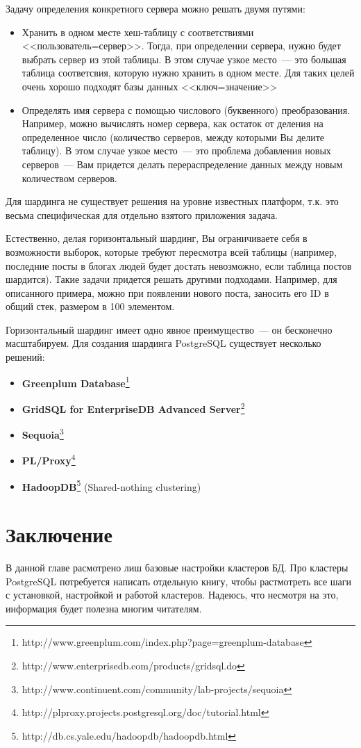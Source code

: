 Задачу определения конкретного сервера можно решать двумя путями:
\begin{itemize}
\item Хранить в одном месте хеш-таблицу с соответствиями <<пользователь=сервер>>. Тогда, при определении сервера, нужно будет 
выбрать сервер из этой таблицы. В этом случае узкое место~--- это большая таблица соответсвия, которую нужно хранить в одном месте. 
Для таких целей очень хорошо подходят базы данных <<ключ=значение>>
\item Определять имя сервера с помощью числового (буквенного) преобразования. Например, можно вычислять номер сервера, 
как остаток от деления на определенное число (количество серверов, между которыми Вы делите таблицу). В этом случае узкое место~--- 
это проблема добавления новых серверов~--- Вам придется делать перераспределение данных между новым количеством серверов.
\end{itemize}

Для шардинга не существует решения на уровне известных платформ, т.к. это весьма специфическая для отдельно взятого приложения задача.

Естественно, делая горизонтальный шардинг, Вы ограничиваете себя в возможности выборок, которые требуют 
пересмотра всей таблицы (например, последние посты в блогах людей будет достать невозможно, если таблица постов шардится). 
Такие задачи придется решать другими подходами. Например, для описанного примера, можно при появлении нового поста, заносить 
его ID в общий стек, размером в 100 элементом.

Горизонтальный шардинг имеет одно явное преимущество~--- он бесконечно масштабируем.
Для создания шардинга PostgreSQL существует несколько решений:
\begin{itemize}
\item \textbf{Greenplum Database}\footnote{http://www.greenplum.com/index.php?page=greenplum-database}
\item \textbf{GridSQL for EnterpriseDB Advanced Server}\footnote{http://www.enterprisedb.com/products/gridsql.do}
\item \textbf{Sequoia}\footnote{http://www.continuent.com/community/lab-projects/sequoia}
\item \textbf{PL/Proxy}\footnote{http://plproxy.projects.postgresql.org/doc/tutorial.html}
\item \textbf{HadoopDB}\footnote{http://db.cs.yale.edu/hadoopdb/hadoopdb.html} (Shared-nothing clustering)
\end{itemize}







\section{Заключение}
В данной главе расмотрено лиш базовые настройки кластеров БД. 
Про кластеры PostgreSQL потребуется написать отдельную книгу, чтобы растмотреть все шаги с установкой, настройкой и работой кластеров.
Надеюсь, что несмотря на это, информация будет полезна многим читателям.